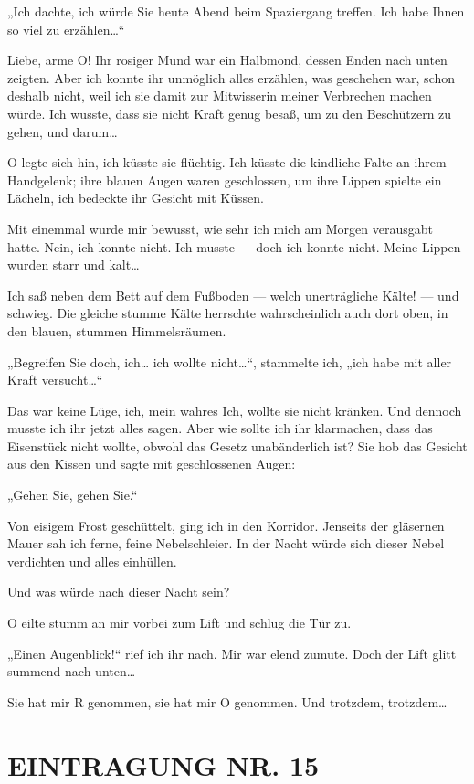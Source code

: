 „Ich dachte, ich würde Sie heute Abend beim Spaziergang treffen.
Ich habe Ihnen so viel zu erzählen\ldots{}“

Liebe, arme O! Ihr rosiger
Mund war ein Halbmond, dessen Enden nach unten zeigten. Aber ich
konnte ihr unmöglich alles erzählen, was geschehen war, schon
deshalb nicht, weil ich sie damit zur Mitwisserin meiner Verbrechen
machen würde. Ich wusste, dass sie nicht Kraft genug besaß, um zu
den Beschützern zu gehen, und darum\ldots{}

O legte sich hin, ich küsste sie flüchtig. Ich küsste die kindliche
Falte an ihrem Handgelenk; ihre blauen Augen waren geschlossen, um
ihre Lippen spielte ein Lächeln, ich bedeckte ihr Gesicht mit
Küssen.

Mit einemmal wurde mir bewusst, wie sehr ich mich am Morgen
verausgabt hatte. Nein, ich konnte nicht. Ich musste — doch ich
konnte nicht. Meine Lippen wurden starr und kalt\ldots{}

Ich saß neben dem Bett auf dem Fußboden — welch unerträgliche
Kälte! — und schwieg. Die gleiche stumme Kälte herrschte
wahrscheinlich auch dort oben, in den blauen, stummen
Himmelsräumen.

„Begreifen Sie doch, ich\ldots{} ich wollte nicht\ldots{}“, stammelte ich,
„ich habe mit aller Kraft versucht\ldots{}“

Das war keine Lüge, ich,
mein wahres Ich, wollte sie nicht kränken. Und dennoch musste ich
ihr jetzt alles sagen. Aber wie sollte ich ihr klarmachen, dass das
Eisenstück nicht wollte, obwohl das Gesetz unabänderlich ist? Sie
hob das Gesicht aus den Kissen und sagte mit geschlossenen Augen:

„Gehen Sie, gehen Sie.“

Von eisigem Frost geschüttelt, ging ich in den Korridor. Jenseits
der gläsernen Mauer sah ich ferne, feine Nebelschleier. In der
Nacht würde sich dieser Nebel verdichten und alles einhüllen.

Und was würde nach dieser Nacht sein?

O eilte stumm an mir vorbei zum Lift und schlug die Tür zu.

„Einen Augenblick!“ rief ich ihr nach. Mir war elend zumute. Doch
der Lift glitt summend nach unten\ldots{}

Sie hat mir R genommen, sie
hat mir O genommen. Und trotzdem, trotzdem\ldots{}

\section{EINTRAGUNG NR. 15}


